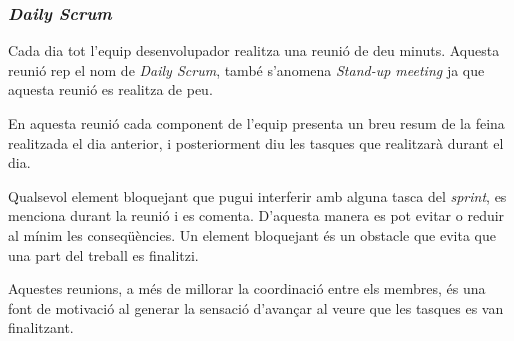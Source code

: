 
\subsubsection{\textit{Daily Scrum}}

Cada dia tot l'equip desenvolupador realitza una reunió de deu minuts. Aquesta reunió rep el nom de \textit{Daily Scrum}, també s'anomena \textit{Stand-up meeting} ja que aquesta reunió es realitza de peu. 

En aquesta reunió cada component de l'equip presenta un breu resum de la feina realitzada el dia anterior, i posteriorment diu les tasques que realitzarà durant el dia.

Qualsevol element bloquejant que pugui interferir amb alguna tasca del \textit{sprint}, es menciona durant la reunió i es comenta. D'aquesta manera es pot evitar o reduir al mínim les conseqüències. Un element bloquejant és un obstacle que evita que una part del treball es finalitzi.

Aquestes reunions, a més de millorar la coordinació entre els membres, és una font de motivació al generar la sensació d'avançar al veure que les tasques es van finalitzant.
